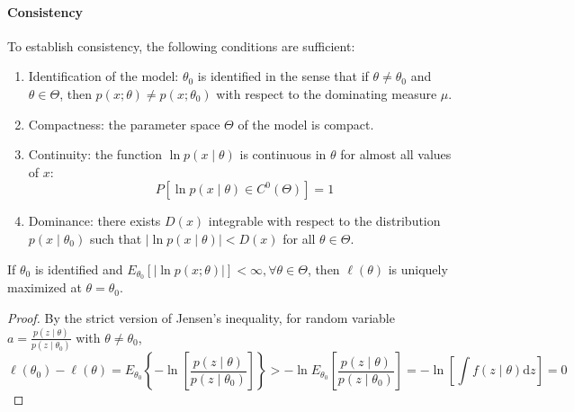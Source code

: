 \paragraph{Consistency}

To establish consistency, the following conditions are sufficient:
\begin{enumerate}
	\item Identification of the model: $\theta_{0}$ is identified in the sense that if $\theta\neq\theta_{0}$ and $\theta\in\Theta$, then $p(x;\theta)\neq p\left(x;\theta_{0}\right)$ with respect to the dominating measure $\mu$.
	\item Compactness: the parameter space $\Theta$ of the model is compact.
	\item Continuity: the function $\ln p(x\mid\theta)$ is continuous in $\theta$ for almost all values of $x$:
	      \begin{equation}
		      P\left[\ln p(x\mid\theta)\in C^{0}(\Theta)\right]=1
	      \end{equation}
	\item Dominance: there exists $D(x)$ integrable with respect to the distribution $p\left(x\mid\theta_{0}\right)$ such that $|\ln p\left(x\mid\theta\right)|<D(x)$ for all $\theta\in \Theta$.
\end{enumerate}

\begin{lemma}
	If $\theta_{0}$ is identified and $E_{\theta_{0}}\left[|\ln p(x;\theta)|\right]<\infty,\forall\theta\in\Theta$, then $\ell(\theta)$ is uniquely maximized at $\theta=\theta_{0}$.
\end{lemma}

\begin{proof}
	By the strict version of Jensen's inequality, for random variable $a=\frac{p(z\mid\theta)}{p(z\mid\theta_{0})}$ with $\theta\neq\theta_{0}$,
	\begin{equation}
		\ell\left(\theta_{0}\right)-\ell(\theta)=E_{\theta_{0}}\left\{-\ln\left[\frac{p(z\mid\theta)}{p(z\mid\theta_{0})}\right]\right\}>-\ln E_{\theta_{0}}\left[\frac{p(z\mid\theta)}{p(z\mid\theta_{0})}\right]=-\ln \left[\int f(z \mid \theta) \mathrm{d} z\right]=0
	\end{equation}
\end{proof}

